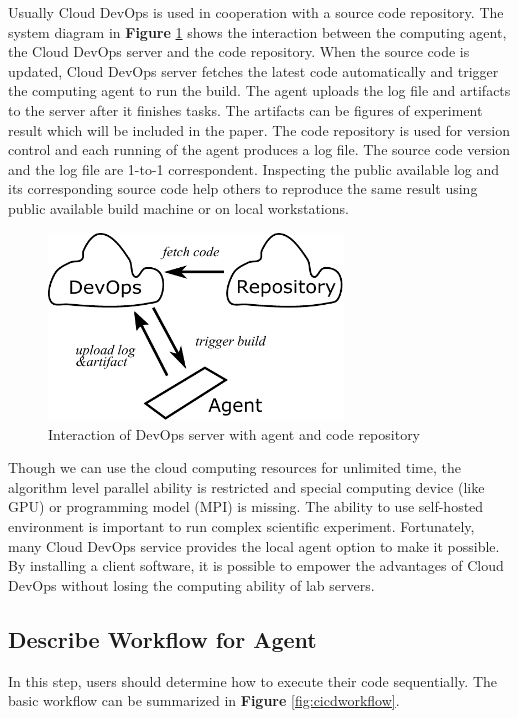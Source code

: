 \documentclass{IEEEcsmag}
\begin{document}
Usually Cloud DevOps is used in cooperation with a source code repository. The system diagram in \textbf{Figure} \ref{fig:principal} shows the interaction between the computing agent, the Cloud DevOps server and the code repository. When the source code is updated, Cloud DevOps server fetches the latest code automatically and trigger the computing agent to run the build. The agent uploads the log file and artifacts to the server after it finishes tasks. The artifacts can be figures of experiment result which will be included in the paper. 
The code repository is used for version control and each running of the agent produces a log file. The source code version and the log file are 1-to-1 correspondent. Inspecting the public available log and its corresponding source code help others to reproduce the same result using public available build machine or on local workstations.

\begin{figure}[!ht]
\centerline{\includegraphics[width=18.5pc]{principal.pdf}}
\caption{Interaction of DevOps server with agent and code repository}\label{fig:principal}
\end{figure}

Though we can use the cloud computing resources for unlimited time, the algorithm level parallel ability is restricted and special computing device (like GPU) or programming model (MPI) is missing. The ability to use self-hosted environment is important to run complex scientific experiment. Fortunately, many Cloud DevOps service provides the local agent option to make it possible. By installing a client software, it is possible to empower the advantages of Cloud DevOps without losing the computing ability of lab servers. 
\subsection{Describe Workflow for Agent}
In this step, users should determine how to execute their code sequentially. The basic workflow can be summarized in \textbf{Figure} \ref{fig:cicdworkflow}.
\end{document}

